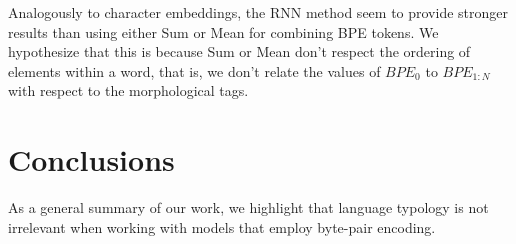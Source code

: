 \documentclass[11pt]{article}
\begin{document}
        
        
        Analogously to character embeddings, the RNN method seem to provide stronger results than using either Sum or Mean for combining BPE tokens. We hypothesize that this is because Sum or Mean don't respect the ordering of elements within a word, that is, we don't relate the values of $BPE_0$ to $BPE_{1:N}$ with respect to the morphological tags. 
    
    \section{Conclusions}
    	As a general summary of our work, we highlight that language typology is not irrelevant when working with models that employ byte-pair encoding.     
	
	
	
	
	
	
\end{document}

